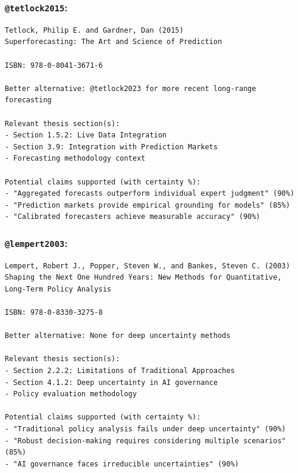 \documentclass[
  11pt,
  letterpaper,
]{book}
\begin{document}
\subsubsection*{\texorpdfstring{\texttt{@tetlock2015}:
\textcite{tetlock2015}}{@tetlock2015: @tetlock2015}}\label{tetlock2015-tetlock2015}

\begin{verbatim}
Tetlock, Philip E. and Gardner, Dan (2015)
Superforecasting: The Art and Science of Prediction

ISBN: 978-0-8041-3671-6

Better alternative: @tetlock2023 for more recent long-range forecasting

Relevant thesis section(s):
- Section 1.5.2: Live Data Integration
- Section 3.9: Integration with Prediction Markets
- Forecasting methodology context

Potential claims supported (with certainty %):
- "Aggregated forecasts outperform individual expert judgment" (90%)
- "Prediction markets provide empirical grounding for models" (85%)
- "Calibrated forecasters achieve measurable accuracy" (90%)
\end{verbatim}

\subsubsection*{\texorpdfstring{\texttt{@lempert2003}:
\textcite{lempert2003}}{@lempert2003: @lempert2003}}\label{lempert2003-lempert2003}

\begin{verbatim}
Lempert, Robert J., Popper, Steven W., and Bankes, Steven C. (2003)
Shaping the Next One Hundred Years: New Methods for Quantitative, Long-Term Policy Analysis

ISBN: 978-0-8330-3275-8

Better alternative: None for deep uncertainty methods

Relevant thesis section(s):
- Section 2.2.2: Limitations of Traditional Approaches
- Section 4.1.2: Deep uncertainty in AI governance
- Policy evaluation methodology

Potential claims supported (with certainty %):
- "Traditional policy analysis fails under deep uncertainty" (90%)
- "Robust decision-making requires considering multiple scenarios" (85%)
- "AI governance faces irreducible uncertainties" (90%)
\end{verbatim}
\end{document}

